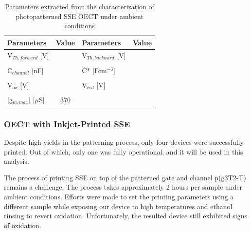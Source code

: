 \begin{table}[ht]
\centering
\caption{Parameters extracted from the characterization of photopatterned SSE OECT under ambient conditions}
\begin{tabular}{l|c||l|c}
Parameters & Value & Parameters & Value \\\hline \hline
V$_{Th,forward}$ [V] &  & V$_{Th,backward}$ [V] & \\
& & &\\[-1em]
C$_{channel}$ [nF] &  & C* [Fcm$^{-3}$] &  \\
& & &\\[-1em]
V$_{ox}$ [V] &   & V$_{red}$ [V] &  \\
& & &\\[-1em]
|g$_{m,max}$| [$\mu$S] & 370 &  &\\\hline
\end{tabular}
\label{tab:photofom}
\end{table}

\newpage
\subsubsection{OECT with Inkjet-Printed SSE}%

Despite high yields in the patterning process, only four devices were successfully printed. Out of which, only one was fully operational, and it will be used in this analysis.

The process of printing SSE on top of the patterned gate and channel p(g3T2-T) remains a challenge. The process takes approximately 2 hours per sample under ambient conditions. Efforts were made to set the printing parameters using a different sample while exposing our device to high temperatures and ethanol rinsing to revert oxidation. Unfortunately, the resulted device still exhibited signs of oxidation.

